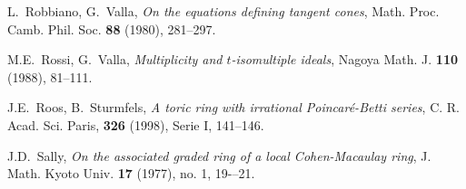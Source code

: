 \documentclass[12pt]{amsart}
\begin{document}
\begin{thebibliography}{}
 L.~Robbiano, G.~Valla, \textit{On the equations defining tangent cones}, Math. Proc. Camb. Phil. Soc. {\bf 88} (1980), 281--297.

 M.E.~Rossi, G.~Valla, \textit{Multiplicity and $t$-isomultiple ideals}, Nagoya Math. J. {\bf 110} (1988), 81--111.

 J.E.~Roos, B.~Sturmfels, \textit{A toric ring with irrational Poincar\'e-Betti series}, C. R. Acad. Sci. Paris, {\bf 326} (1998), Serie I, 141--146.

 
 J.D.~Sally, \textit{On the associated graded ring of a local Cohen-Macaulay ring}, J. Math. Kyoto Univ. {\bf 17} (1977), no. 1, 19-–21.
 

\end{thebibliography}{}
\end{document}
